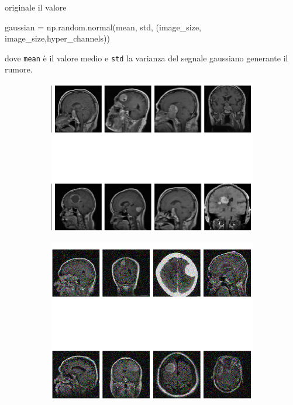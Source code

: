 \begin{enumerate}
    originale il valore
    \begin{python}
    gaussian = np.random.normal(mean, std, (image_size, image_size,hyper_channels))
    \end{python}
    dove \lstinline{mean} è il valore medio e \lstinline{std} la varianza del segnale gaussiano generante il rumore.\\
    \begin{figure}[H]
      \begin{subfigure}{0.5\textwidth}
        \centering
        \includegraphics[width=.95\textwidth]{Figures/images-no-noise.png}
        \caption{}
        \label{fig:snap1}
      \end{subfigure}%
      \begin{subfigure}{0.5\textwidth}
        \centering
        \includegraphics[width=.95\textwidth]{Figures/images-noise-var-20}

\end{subfigure}
\end{figure}
\end{enumerate}
